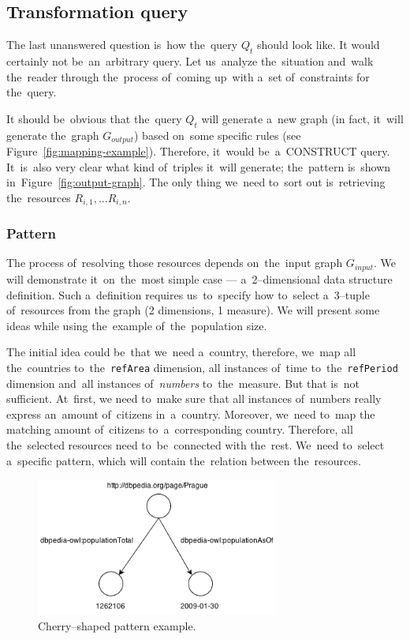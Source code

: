 \subsection{Transformation query}

The last unanswered question is~how the~query $Q_t$ should look like. 
It would certainly not be~an~arbitrary query. Let us~analyze the~situation and~walk the~reader through the~process of~coming up~with a~set of~constraints for the~query.

It should be~obvious that the~query $Q_t$ will generate a~new graph
(in fact, it~will generate the~graph $G_{output}$) based on~some specific rules
(see Figure~\ref{fig:mapping-example}). 
Therefore, it~would be~a~CONSTRUCT query. It~is~also very clear what kind of~triples it~will generate; the~pattern is~shown in~Figure~\ref{fig:output-graph}.
The only thing we~need to~sort out is~retrieving the~resources $R_{i,1}, ... R_{i,n}$.

\subsubsection{Pattern}
\label{sec:pattern-definition}
The process of~resolving those resources depends on~the~input graph $G_{input}$.
We will demonstrate it~on~the~most simple case --- a~2--dimensional data structure 
definition. Such a~definition requires us~to~specify how to~select a~3--tuple of~resources from 
the graph (2 dimensions, 1 measure).
We will present some ideas while using the~example of~the~population size.

The initial idea could be~that we~need a~country, therefore, we~map all the~countries to~the~\texttt{refArea} dimension, all instances of~time to~the~\texttt{refPeriod} 
dimension and~all instances of~\emph{numbers} to~the~measure. But that is~not sufficient. At~first,
we need to~make sure that all instances of~numbers 
really express an~amount of~citizens in~a~country. Moreover, we~need to~map the
matching amount of~citizens to~a~corresponding country. Therefore, all the~selected resources need to~be~connected with the~rest. We~need to~select a~specific pattern, which will contain the~relation between the~resources.

\begin{figure}
	\centering
	\includegraphics[width=80mm]{images/cherry.png}
	\caption{Cherry--shaped pattern example.}
	\label{fig:cherry}
\end{figure}


